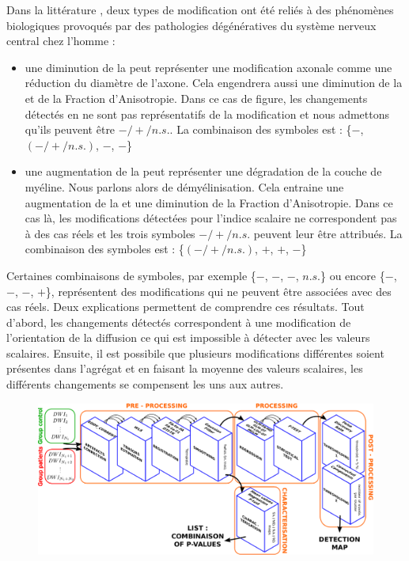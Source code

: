Dans la littérature \cite{Harsan2006}, deux types de modification ont été reliés à des phénomènes biologiques provoqués 
par des pathologies dégénératives du système nerveux central chez l'homme :\\
\begin{itemize}
    \item une diminution de la \da peut représenter une modification axonale comme une réduction du diamètre de l'axone.
    Cela engendrera aussi une diminution de la \md et de la Fraction d'Anisotropie.
    Dans ce cas de figure, les changements détectés en \dr ne sont pas représentatifs de la modification et nous admettons qu'ils peuvent être $-/+/n.s.$.
    La combinaison des symboles est : \{$-$, $(-/+/n.s.)$, $-$, $-$\}\\
    \item une augmentation de la \dr peut représenter une dégradation de la couche de myéline.
    Nous parlons alors de démyélinisation.
    Cela entraine une augmentation de la \md et une diminution de la Fraction d'Anisotropie.
    Dans ce cas là, les modifications détectées pour l'indice scalaire \da ne correspondent pas à des cas réels et les trois symboles $-/+/n.s.$ peuvent leur être attribués.
    La combinaison des symboles est : \{$(-/+/n.s.)$, $+$, $+$, $-$\}\\
\end{itemize}

Certaines combinaisons de symboles, par exemple \{$-$, $-$, $-$, $n.s.$\} ou encore \{$-$, $-$, $-$, $+$\}, 
représentent des modifications qui ne peuvent être associées avec des cas réels.
Deux explications permettent de comprendre ces résultats.
Tout d'abord, les changements détectés correspondent à une modification de l'orientation de la diffusion ce qui est impossible à détecter avec les valeurs scalaires.
Ensuite, il est possibile que plusieurs modifications différentes soient présentes dans l'agrégat et en faisant la moyenne des valeurs scalaires, 
les différents changements se compensent les uns aux autres.


\begin{figure}[ht]
    \centering
    \includegraphics[width=1\textwidth]{Images/pipeline.pdf}
\end{figure}
